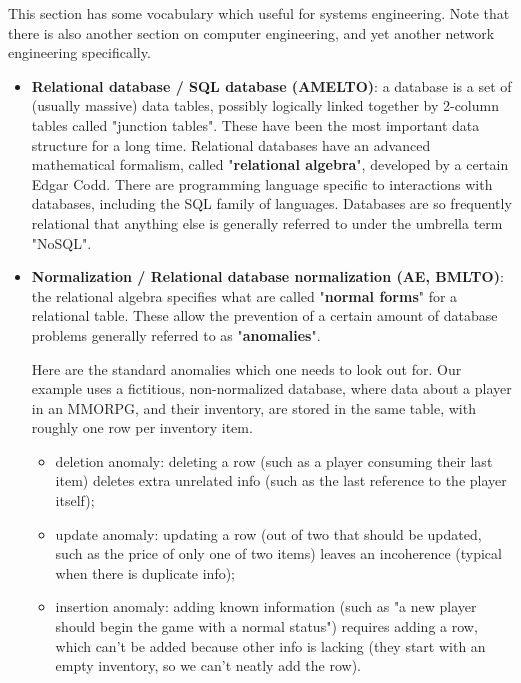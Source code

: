 \documentclass{article}
\begin{document}
This section has some vocabulary which useful for systems engineering. Note that there is also another section on computer engineering, and yet another network engineering specifically. 

\begin{itemize}

	\item \textbf{Relational database / SQL database (AMELTO)}: a database is a set of (usually massive) data tables, possibly logically linked together by 2-column tables called "junction tables". These have been the most important data structure for a long time. Relational databases have an advanced mathematical formalism, called "\textbf{relational algebra}", developed by a certain Edgar Codd. There are programming language specific to interactions with databases, including the SQL family of languages. Databases are so frequently relational that anything else is generally referred to under the umbrella term "NoSQL".

	\item \textbf{Normalization / Relational database normalization (AE, BMLTO)}: the relational algebra specifies what are called "\textbf{normal forms}" for a relational table. These allow the prevention of a certain amount of database problems generally referred to as "\textbf{anomalies}".

	Here are the standard anomalies which one needs to look out for. Our example uses a fictitious, non-normalized database, where data about a player in an MMORPG, and their inventory, are stored in the same table, with roughly one row per inventory item.  
	\begin{itemize}
		\item deletion anomaly: deleting a row (such as a player consuming their last item) deletes extra unrelated info (such as the last reference to the player itself);
		\item update anomaly: updating a row (out of two that should be updated, such as the price of only one of two items) leaves an incoherence (typical when there is duplicate info);
		\item insertion anomaly: adding known information (such as "a new player should begin the game with a normal status") requires adding a row, which can't be added because other info is lacking (they start with an empty inventory, so we can't neatly add the row).
	\end{itemize}


\end{itemize}
\end{document}
